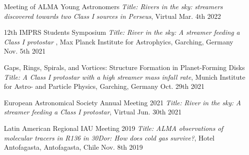 

\begin{cvhonors}

  \cvhonor
    {Meeting of ALMA Young Astronomers} %
    {\textit{Title: Rivers in the sky: streamers discovered towards two Class I sources in Perseus}, Virtual} %
    {} %
    {Mar. 4th 2022} %

 
  \cvhonor
    {12th IMPRS Students Symposium} %
    {\textit{Title: River in the sky: A streamer feeding a Class I protostar} , Max Planck Institute for Astrophyics, Garching, Germany}%
    {} %
    {Nov. 5th 2021} %

  \cvhonor
    {Gaps, Rings, Spirals, and Vortices: Structure Formation in Planet-Forming Disks} %
    {\textit{Title: A Class I protostar with a high streamer mass infall rate}, Munich Institute for Astro- and Particle Physics, Garching, Germany} %
    {} %
    {Oct. 29th 2021} %

  \cvhonor
    {European Astronomical Society Annual Meeting 2021} %
    {\textit{Title: River in the sky: A streamer feeding a Class I protostar}, Virtual} %
    {} %
    {Jun. 30th 2021} %

  \cvhonor
    {Latin American Regional IAU Meeting 2019} %
    {\textit{Title: ALMA observations of molecular tracers in R136 in 30Dor: How does cold gas survive?}, Hotel Antofagasta, Antofagasta, Chile} %
    {} %
    {Nov. 8th 2019} %

\end{cvhonors}

